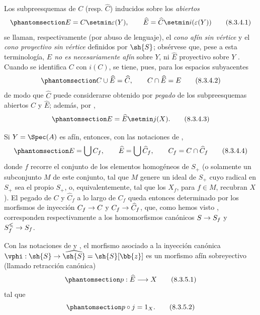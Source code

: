 \documentclass[oneside,10pt]{amsart}
\makeatletter
\renewcommand{\leq}{\leqslant}
\newcommand{\ega@arrow}[2]{\mathchoice{#1}{#2}{#2}{#2}}
\renewcommand{\to}{\ega@arrow{\longrightarrow}{\rightarrow}}
\newcommand{\oldpage}[2][]{\marginnote{\normalfont\footnotesize\textbf{#1}~|~#2}\ignorespaces}
\let\EGAOriginalLabel\label
\renewcommand{\label}[1]{\phantomsection\EGAOriginalLabel{#1}}
\makeatother
\begin{document}
\begin{env}[8.3.4]
\label{II.8.3.4}
Los subpreesquemas de $C$ (resp. $\widehat{C}$) inducidos sobre los \emph{abiertos}
\[
\label{II.8.3.4.1}
  E = C \setmin \varepsilon(Y),
  \qquad
  \widehat{E} = \widehat{C} \setmin i(\varepsilon(Y))
\tag{8.3.4.1}
\]
se llaman, respectivamente (por abuso de lenguaje), el \emph{cono afín sin vértice} y el \emph{cono proyectivo sin vértice} definidos por $\sh{S}$;
obsérvese que, pese a esta terminología, \emph{$E$ no es necesariamente afín} sobre $Y$, ni $\widehat{E}$ proyectivo sobre $Y$ .
Cuando se identifica $C$ con $i(C)$, se tiene, pues, para los espacios subyacentes
\[
\label{II.8.3.4.2}
  C \cup \widehat{E} = \widehat{C},
  \qquad
  C \cap \widehat{E} = E
\tag{8.3.4.2}
\]
de modo que $\widehat{C}$ puede considerarse obtenido por \emph{pegado} de los subpreesquemas abiertos $C$ y $\widehat{E}$;
además, por ,
\[
\label{II.8.3.4.3}
  E = \widehat{E} \setmin j(X).
\tag{8.3.4.3}
\]

\oldpage[II]{165}
Si $Y=\Spec(A)$ es afín, entonces, con las notaciones de ,
\[
\label{II.8.3.4.4}
  E = \bigcup C_f,
  \qquad
  \widehat{E} = \bigcup \widehat{C}_f,
  \qquad
  C_f = C \cap \widehat{C}_f
\tag{8.3.4.4}
\]
donde $f$ recorre el conjunto de los elementos homogéneos de $S_+$ (o solamente un subconjunto $M$ de este conjunto, tal que $M$ genere un ideal de $S_+$ cuyo radical en $S_+$ sea el propio $S_+$, o, equivalentemente, tal que los $X_f$, para $f\in M$, recubran $X$ ).
El pegado de $C$ y $\widehat{C}_f$ a lo largo de $C_f$ queda entonces determinado por los morfismos de inyección $C_f\to C$ y $C_f\to\widehat{C}_f$, que, como hemos visto , corresponden respectivamente a los homomorfismos canónicos $S\to S_f$ y $S_f^\leq\to S_f$.
\end{env}
\begin{proposition}[8.3.5]
\label{II.8.3.5}
Con las notaciones de  y , el morfismo asociado  a la inyección canónica $\vphi:\sh{S} \to \widehat{\sh{S}} = \sh{S}[\bb{z}]$ es un morfismo afín sobreyectivo \textup{(llamado} retracción canónica)
\[
\label{II.8.3.5.1}
  p:\widehat{E} \to X
\tag{8.3.5.1}
\]
tal que
\[
\label{II.8.3.5.2}
  p \circ j = 1_X.
\tag{8.3.5.2}
\]
\end{proposition}
\end{document}
